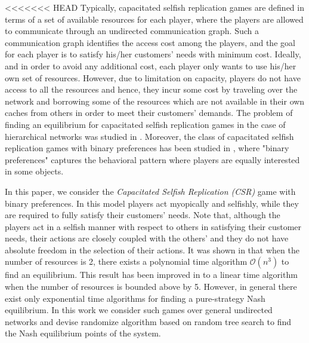 <<<<<<< HEAD
Typically, capacitated selfish replication games are defined in terms of a set of available resources for each player, where the players are allowed to communicate through an undirected communication graph. Such a communication graph identifies the access cost among the players, and the goal for each player is to satisfy his/her customers' needs with minimum cost. Ideally, and in order to avoid any additional cost, each player only wants to use his/her own set of resources. However, due to limitation on capacity, players do not have access to all the resources and hence, they incur some cost by traveling over the network and borrowing some of the resources which are not available in their own caches from others in order to meet their customers' demands. The problem of finding an equilibrium for capacitated selfish replication games in the case of hierarchical networks was studied in \cite{gopalakrishnan2012cache}. Moreover, the class of capacitated selfish replication games with binary preferences has been studied in \cite{gopalakrishnan2012cache,etesami2014pure}, where "binary preferences" captures the behavioral pattern where players are equally interested in some objects.

In this paper, we consider the \emph{Capacitated Selfish Replication (CSR)} game with binary preferences. In this model players act myopically and selfishly, while they are required to fully satisfy their customers' needs. Note that, although the players act in a selfish manner with respect to others in satisfying their customer needs, their actions are closely coupled with the others' and they do not have absolute freedom in the selection of their actions. It was shown in \cite{gopalakrishnan2012cache} that when the number of resources is 2, there exists a polynomial time algorithm $\mathcal{O}(n^3)$ to find an equilibrium. This result has been improved in \cite{etesami2014pure} to a linear time algorithm when the number of resources is bounded above by 5. However, in general there exist only exponential time algorithms for finding a pure-strategy Nash equilibrium. In this work we consider such games over general undirected networks and devise randomize algorithm based on random tree search to find the Nash equilibrium points of the system.


